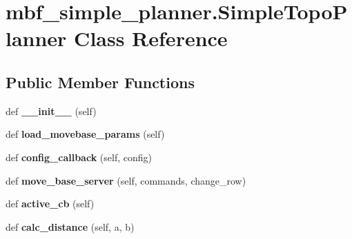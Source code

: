 \hypertarget{classmbf__simple__planner_1_1SimpleTopoPlanner}{}\section{mbf\+\_\+simple\+\_\+planner.\+Simple\+Topo\+Planner Class Reference}
\label{classmbf__simple__planner_1_1SimpleTopoPlanner}
\subsection*{Public Member Functions}
\begin{DoxyCompactItemize}
\item 
\mbox{\label{classmbf__simple__planner_1_1SimpleTopoPlanner_af944f3db85a31ef442cd59b67ab861fe}} 
def {\bfseries \+\_\+\+\_\+init\+\_\+\+\_\+} (self)
\item 
\mbox{\label{classmbf__simple__planner_1_1SimpleTopoPlanner_a061cee464e240e9a46cdd4c5e20b0df1}} 
def {\bfseries load\+\_\+movebase\+\_\+params} (self)
\item 
\mbox{\label{classmbf__simple__planner_1_1SimpleTopoPlanner_a9768997c49f3a61fab5eb32deb43f2e2}} 
def {\bfseries config\+\_\+callback} (self, config)
\item 
\mbox{\label{classmbf__simple__planner_1_1SimpleTopoPlanner_a380ff78278715c1092d9af40b3a76dbd}} 
def {\bfseries move\+\_\+base\+\_\+server} (self, commands, change\+\_\+row)
\item 
\mbox{\label{classmbf__simple__planner_1_1SimpleTopoPlanner_a90bfa9529b3fccd0600c6a598a4a6e88}} 
def {\bfseries active\+\_\+cb} (self)
\item 
\mbox{\label{classmbf__simple__planner_1_1SimpleTopoPlanner_aedc7cc21f9f5257b93f772a653f15776}} 
def {\bfseries calc\+\_\+distance} (self, a, b)
\item 
\mbox{\label{classmbf__simple__planner_1_1SimpleTopoPlanner_a961772005be51a23d8a8e28398a90caf}} 

\end{DoxyCompactItemize}

